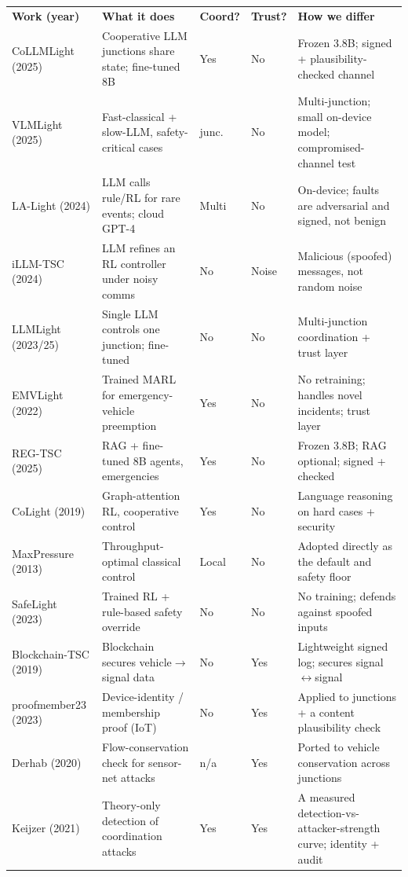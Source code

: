 \documentclass[11pt]{article}
\begin{document}
\vspace{4pt}
{\scriptsize\setlength{\tabcolsep}{4pt}
\begin{tabular}{>{\raggedright\arraybackslash}p{2.0cm} >{\raggedright\arraybackslash}p{4.7cm} >{\centering\arraybackslash}p{0.9cm} >{\centering\arraybackslash}p{0.9cm} >{\raggedright\arraybackslash}p{6.6cm}}
\rowcolor{nbblue!18}
\textbf{Work (year)} & \textbf{What it does} & \textbf{Coord?} & \textbf{Trust?} & \textbf{How we differ} \\
CoLLMLight (2025) & Cooperative LLM junctions share state; fine-tuned 8B & Yes & No & Frozen 3.8B; signed + plausibility-checked channel \\
VLMLight (2025) & Fast-classical + slow-LLM, safety-critical cases & 1 junc. & No & Multi-junction; small on-device model; compromised-channel test \\
LA-Light (2024) & LLM calls rule/RL for rare events; cloud GPT-4 & Multi & No & On-device; faults are adversarial and signed, not benign \\
iLLM-TSC (2024) & LLM refines an RL controller under noisy comms & No & Noise & Malicious (spoofed) messages, not random noise \\
LLMLight (2023/25) & Single LLM controls one junction; fine-tuned & No & No & Multi-junction coordination + trust layer \\
EMVLight (2022) & Trained MARL for emergency-vehicle preemption & Yes & No & No retraining; handles novel incidents; trust layer \\
REG-TSC (2025) & RAG + fine-tuned 8B agents, emergencies & Yes & No & Frozen 3.8B; RAG optional; signed + checked \\
CoLight (2019) & Graph-attention RL, cooperative control & Yes & No & Language reasoning on hard cases + security \\
MaxPressure (2013) & Throughput-optimal classical control & Local & No & Adopted directly as the default and safety floor \\
SafeLight (2023) & Trained RL + rule-based safety override & No & No & No training; defends against spoofed inputs \\
Blockchain-TSC (2019) & Blockchain secures vehicle$\rightarrow$signal data & No & Yes & Lightweight signed log; secures signal$\leftrightarrow$signal \\
proofmember23 (2023) & Device-identity / membership proof (IoT) & No & Yes & Applied to junctions + a content plausibility check \\
Derhab (2020) & Flow-conservation check for sensor-net attacks & n/a & Yes & Ported to vehicle conservation across junctions \\
Keijzer (2021) & Theory-only detection of coordination attacks & Yes & Yes & A measured detection-vs-attacker-strength curve; identity + audit \\
\end{tabular}}
\end{document}
